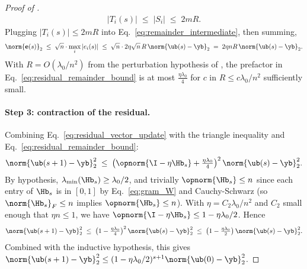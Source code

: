 \begin{proof}[Proof of ]
\begin{align}\label{eq:flip_count_inherited}
|T_i(s)| \;\le\; |S_i| \;\le\; 2 m R.
\end{align}
Plugging $|T_i(s)| \le 2mR$ into Eq.~\eqref{eq:remainder_intermediate}, then summing,
\begin{align}\label{eq:residual_remainder_bound}
\norm{\mathbf e(s)}_2
\;\le\; \sqrt n \cdot \max_i |e_i(s)|
\;\le\; \sqrt n \cdot 2 \eta \sqrt n \, R \, \norm{\ub(s) - \yb}_2
\;=\; 2 \eta n R \, \norm{\ub(s) - \yb}_2.
\end{align}
With $R = O(\lambda_0 / n^2)$ from the perturbation hypothesis of , the prefactor in Eq.~\eqref{eq:residual_remainder_bound} is at most $\tfrac{\eta \lambda_0}{4}$ for $c$ in $R \le c \lambda_0 / n^2$ sufficiently small.

\paragraph{Step 3: contraction of the residual.}
Combining Eq.~\eqref{eq:residual_vector_update} with the triangle inequality and Eq.~\eqref{eq:residual_remainder_bound}:
\begin{align}\label{eq:res_squared_step}
\norm{\ub(s+1) - \yb}_2^2
\;\le\; \big( \opnorm{\I - \eta \Hb_s} + \tfrac{\eta \lambda_0}{4} \big)^2 \, \norm{\ub(s) - \yb}_2^2.
\end{align}
By hypothesis, $\lambda_{\min}(\Hb_s) \ge \lambda_0/2$, and trivially $\opnorm{\Hb_s} \le n$ since each entry of $\Hb_s$ is in $[0, 1]$ by Eq.~\eqref{eq:gram_W} and Cauchy-Schwarz (so $\norm{\Hb_s}_F \le n$ implies $\opnorm{\Hb_s} \le n$). With $\eta = C_2 \lambda_0 / n^2$ and $C_2$ small enough that $\eta n \le 1$, we have $\opnorm{\I - \eta \Hb_s} \le 1 - \eta \lambda_0/2$. Hence
\begin{align*}
\norm{\ub(s+1) - \yb}_2^2
\;\le\; \big( 1 - \tfrac{\eta \lambda_0}{4} \big)^2 \, \norm{\ub(s) - \yb}_2^2
\;\le\; \big( 1 - \tfrac{\eta \lambda_0}{2} \big) \, \norm{\ub(s) - \yb}_2^2.
\end{align*}
Combined with the inductive hypothesis, this gives $\norm{\ub(s+1) - \yb}_2^2 \le (1 - \eta \lambda_0/2)^{s+1} \norm{\ub(0) - \yb}_2^2$.


\end{proof}
